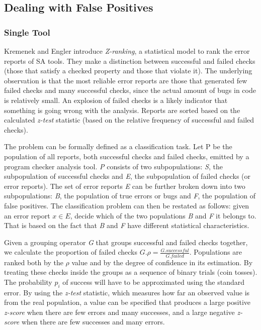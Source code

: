 \documentclass{article}
\begin{document}
 \subsection{Dealing with False Positives}

 \subsubsection{Single Tool}

 Kremenek and Engler \cite{z-ranking} introduce \textit{Z-ranking}, a statistical model to rank the error reports of SA tools. They make a distinction between successful and failed checks (those that satisfy a checked property and those that violate it). The underlying observation is that the most reliable error reports are those that generated few failed checks and many successful checks, since the actual amount of bugs in code is relatively small. An explosion of failed checks is a likely indicator that something is going wrong with the analysis. Reports are sorted based on the calculated \textit{z-test} statistic (based on the relative frequency of successful and failed checks).

 The problem can be formally defined as a classification task. Let P be the population of all reports, both successful checks and failed checks, emitted by a program checker analysis tool. \textit{P} consists of two subpopulations: \textit{S}, the subpopulation of successful checks and \textit{E}, the subpopulation of failed checks (or error reports). The set of error reports \textit{E} can be further broken down into two subpopulations: \textit{B}, the population of true errors or bugs and \textit{F}, the population of false positives. The classification problem can then be restated as follows: given an error report $x \in E$, decide which of the two populations \textit{B} and \textit{F} it belongs to. That is based on the fact that \textit{B} and \textit{F} have different statistical characteristics. 

 Given a grouping operator \textit{G} that groups successful and failed checks together, we calculate the proportion of failed checks $G.\rho = \frac{G.successful}{G.failed}$. Populations are ranked both by the $\rho$ value and by the degree of confidence in its estimation. By treating these checks inside the groups as a sequence of binary trials (coin tosses). The probability $p_i$ of success will have to be approximated using the standard error. By using the \textit{z-test} statistic, which measures how far an observed value is from the real population, a value can be specified that produces a large positive \textit{z-score} when there are few errors and many successes, and a large negative \textit{z-score} when there are few successes and many errors.
\end{document}
